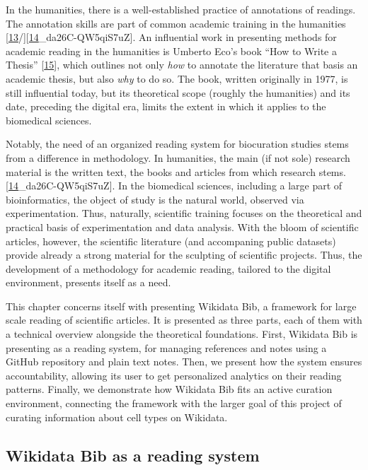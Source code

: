 In the humanities, there is a well-established practice of annotations of readings.
The annotation skills are part of common academic training in the humanities {[}\protect\hyperlink{ref-rPKBwmYh}{13}/{]}{[}\protect\hyperlink{ref-PKhuVRW8}{14}\_da26C-QW5qiS7uZ{]}.
An influential work in presenting methods for academic reading in the humanities is Umberto Eco's book ``How to Write a Thesis'' {[}\protect\hyperlink{ref-1HBVPtZGp}{15}{]}, which outlines not only \emph{how} to annotate the literature that basis an academic thesis, but also \emph{why} to do so.
The book, written originally in 1977, is still influential today, but its theoretical scope (roughly the humanities) and its date, preceding the digital era, limits the extent in which it applies to the biomedical sciences.

Notably, the need of an organized reading system for biocuration studies stems from a difference in methodology.
In humanities, the main (if not sole) research material is the written text, the books and articles from which research stems. {[}\protect\hyperlink{ref-PKhuVRW8}{14}\_da26C-QW5qiS7uZ{]}.
In the biomedical sciences, including a large part of bioinformatics, the object of study is the natural world, observed via experimentation.
Thus, naturally, scientific training focuses on the theoretical and practical basis of experimentation and data analysis.
With the bloom of scientific articles, however, the scientific literature (and accompaning public datasets) provide already a strong material for the sculpting of scientific projects.
Thus, the development of a methodology for academic reading, tailored to the digital environment, presents itself as a need.

This chapter concerns itself with presenting Wikidata Bib, a framework for large scale reading of scientific articles.
It is presented as three parts, each of them with a technical overview alongside the theoretical foundations.
First, Wikidata Bib is presenting as a reading system, for managing references and notes using a GitHub repository and plain text notes.
Then, we present how the system ensures accountability, allowing its user to get personalized analytics on their reading patterns.
Finally, we demonstrate how Wikidata Bib fits an active curation environment, connecting the framework with the larger goal of this project of curating information about cell types on Wikidata.

\hypertarget{wikidata-bib-as-a-reading-system}{%
\subsection{Wikidata Bib as a reading system}\label{wikidata-bib-as-a-reading-system}}

